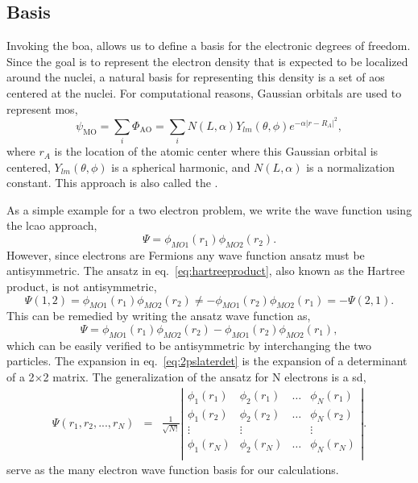 \subsection{Basis}
Invoking the \gls{boa}, allows us to define a basis for the electronic degrees of freedom.
Since the goal is to represent the electron density that is expected to be localized around the nuclei, a natural basis for representing this density is a set of \glspl{ao} centered at the nuclei.
For computational reasons, Gaussian orbitals are used to represent \glspl{mo},
\begin{equation}
\psi_{\textrm{MO}} = \sum_{i} \Phi_{\textrm{AO}} = \sum_{i} N(L, \alpha) Y_{lm}(\theta, \phi) e^{-\alpha |r - R_A|^2},
\end{equation}
where $r_A$ is the location of the atomic center where this Gaussian orbital is centered, $Y_{lm}(\theta, \phi)$ is a spherical harmonic, and $N(L, \alpha)$ is a normalization constant.
This approach is also called the .

As a simple example for a two electron problem, we write the wave function using the \gls{lcao} approach,
\begin{equation}
\Psi = \phi_{MO1}(r_1) \phi_{MO2}(r_2).
\label{eq:hartreeproduct}
\end{equation}
However, since electrons are Fermions any wave function ansatz must be antisymmetric.
The ansatz in eq.~\ref{eq:hartreeproduct}, also known as the Hartree product, is not antisymmetric,
\begin{equation}
\Psi(1,2) = \phi_{MO1}(r_1) \phi_{MO2}(r_2) \neq -\phi_{MO1}(r_2) \phi_{MO2}(r_1) = -\Psi(2,1).
\end{equation}
This can be remedied by writing the ansatz wave function as, 
\begin{equation}
\Psi = \phi_{MO1}(r_1) \phi_{MO2}(r_2) - \phi_{MO1}(r_2) \phi_{MO2}(r_1),
\label{eq:2pslaterdet}
\end{equation}
which can be easily verified to be antisymmetric by interchanging the two particles.
The expansion in eq.~\ref{eq:2pslaterdet} is the expansion of a determinant of a 2$\times$2 matrix.
The generalization of the ansatz for N electrons is a \gls{sd},
\begin{eqnarray}
	\Psi(r_1,r_2,...,r_N) &=& \frac{1}{\sqrt{N!}} 
		\left|
			\begin{array}{cccc}
				\phi_1(r_1) & \phi_2(r_1) & \ldots & \phi_N(r_1) \\
				\phi_1(r_2) & \phi_2(r_2) & \ldots & \phi_N(r_2) \\
				\vdots      & \vdots      &        & \vdots      \\
				\phi_1(r_N) & \phi_2(r_N) & \ldots & \phi_N(r_N) \\
			\end{array}
		\right|.
\end{eqnarray}
 serve as the many electron wave function basis for our calculations.
